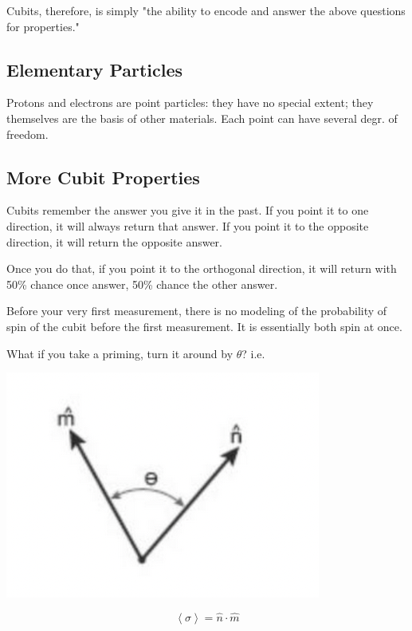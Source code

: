 \documentclass[letterpaper]{article}
\begin{document}
Cubits, therefore, is simply "the ability to encode and answer the above questions for properties."

\subsection{Elementary Particles}
\label{sec:org1733692}
Protons and electrons are point particles: they have no special extent; they themselves are the basis of other materials. Each point can have several degr. of freedom. 

\subsection{More Cubit Properties}
\label{sec:org124d012}
Cubits remember the answer you give it in the past. If you point it to one direction, it will always return that answer. If you point it to the opposite direction, it will return the opposite answer.

Once you do that, if you point it to the orthogonal direction, it will return with 50\% chance once answer, 50\% chance the other answer.

Before your very first measurement, there is no modeling of the probability of spin of the cubit before the first measurement. It is essentially both spin at once.

What if you take a priming, turn it around by \(\theta\)? i.e.

\begin{center}
\includegraphics[width=.9\linewidth]{2022-01-25_09-57-15_screenshot.png}
\end{center}

\begin{equation}
    \left<\sigma\right> = \hat{n} \cdot \hat{m}
\end{equation}
\end{document}
